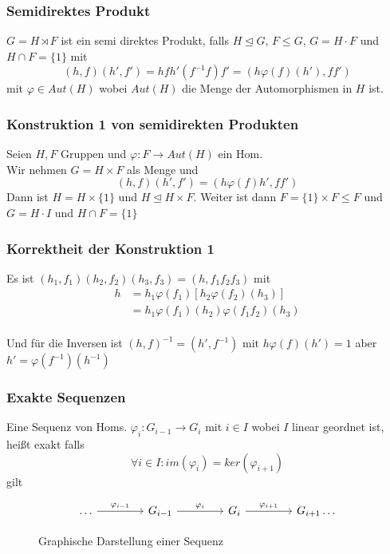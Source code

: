 \documentclass[12pt, german]{article}
\begin{document}
\subsubsection{Semidirektes Produkt}
	$G = H \rtimes F$ ist ein semi direktes Produkt, falls $H \trianglelefteq G$, $F \leq G$,  $G = H\cdot F$ und $H \cap F = \{1\}$ mit 
	$$(h,f)(h',f') = hfh'(f^{-1}f)f' = (h\varphi(f)(h'), ff')$$
	mit $\varphi \in Aut(H)$ wobei $Aut(H)$ die Menge der Automorphismen in $H$ ist.

\subsubsection{Konstruktion 1 von semidirekten Produkten}
	Seien $H, F$ Gruppen und $\varphi: F\to Aut(H)$ ein Hom. \\ 
	Wir nehmen $G = H \times F$ als Menge und $$ (h,f)(h',f') = (h\varphi(f)h', ff')$$
	Dann ist $H= H \times \{1\}$ und $H \trianglelefteq H \times F$. 
	Weiter ist dann $F = \{1\} \times F \leq F$ und $G= H\cdot I$ und $H\cap F = \{1\}$

\subsubsection{Korrektheit der Konstruktion 1}
	Es ist $(h_1, f_1)(h_2, f_2)(h_3, f_3) = (h, f_1f_2f_3)$ mit 
	\begin{align*}
		h&=h_1\varphi(f_1)[h_2\varphi(f_2)(h_3)] \\
		&=h_1\varphi(f_1)(h_2)\varphi(f_1f_2)(h_3)
	\end{align*} 
	\\ 
	Und für die Inversen ist $(h, f)^{-1} = (h', f^{-1}) \text{ mit } h\varphi(f)(h')= 1$ aber $h' = \varphi(f^{-1})(h^{-1})$

\subsubsection{Exakte Sequenzen}
Eine Sequenz von Homs. $\varphi_i: G_{i-1} \to G_i$ mit $i \in I$ wobei $I$ linear geordnet ist, heißt exakt falls $$\forall i \in I : im(\varphi_i) = ker(\varphi_{i+1})$$ gilt
	\begin{figure}[h!]
		\centering
	\begin{equation*}
		\begin{tikzcd}[column sep=3.5pc]
				\ldots \arrow{r}{\varphi_{i-1}} & G_{i -1} \arrow{r}{\varphi_{i}} & G_{i} \arrow{r}{\varphi_{i+1}} & G_{i+1} \ldots 
		\end{tikzcd}
	\end{equation*}
		\caption{Graphische Darstellung einer Sequenz}
\end{figure}
\end{document}
